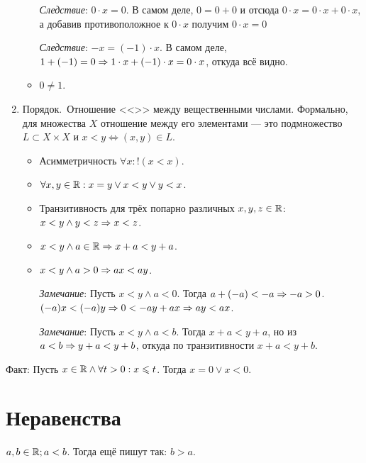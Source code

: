 \documentclass[a4paper]{report}
\begin{document}
\begin{enumerate}
\begin{itemize}
            \emph{Следствие}: $0 \cdot x = 0$.
            В самом деле, $0 = 0 + 0$ и отсюда $0 \cdot x = 0 \cdot x + 0 \cdot x$, а добавив противоположное к $0\cdot x$ получим $0\cdot x = 0$

            \emph{Следствие}: $-x = (-1) \cdot x$.
            В самом деле, $1 + (-1) = 0 \Rightarrow 1 \cdot x + (-1) \cdot x = 0 \cdot x$, откуда всё видно.
            \item $0 \ne 1$.
        \end{itemize}
        \item Порядок.\ Отношение <<\text{<}>> между вещественными числами.
        Формально, для множества $X$ отношение между его элементами --- это подмножество $L \subset X \times X$ и $x < y \iff (x, y) \in L$.
        \begin{itemize}
            \item Асимметричность $\forall x : !(x < x)$.
            \item $\forall x, y \in \mathbb{R}: x = y \lor x < y \lor y < x$.
            \item Транзитивность для трёх попарно различных $x, y, z \in \mathbb{R}$: $x < y \land y < z \Rightarrow x < z$.
            \item $x < y \land a \in \mathbb{R} \Rightarrow x + a < y + a$.
            \item $x < y \land a > 0 \Rightarrow ax < ay$.

            \emph{Замечание}: Пусть $x < y \land a < 0$.
            Тогда $a + (-a) < -a \Rightarrow -a > 0$. $(-a)x < (-a)y \Rightarrow 0 < -ay + ax \Rightarrow ay < ax$.

            \emph{Замечание}: Пусть $x < y \land a < b$.
            Тогда $x + a < y + a$, но из $a < b \Rightarrow y + a < y + b$, откуда по транзитивности $x + a < y + b$.
        \end{itemize}
    \end{enumerate}
    Факт: Пусть $x \in \mathbb{R} \land \forall t > 0 : x \leqslant t$.
    Тогда $x = 0 \lor x < 0$.



    \section{Неравенства}
    $a, b \in \mathbb{R}; a < b$.
    Тогда ещё пишут так: $b > a$.
\end{document}
